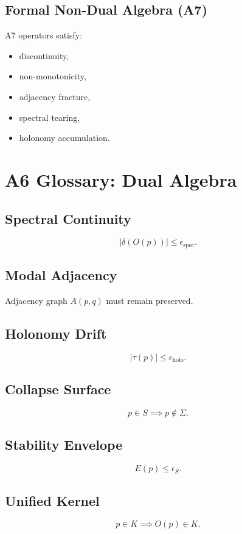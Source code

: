 \documentclass[11pt]{article}
\begin{document}
\subsection{Formal Non-Dual Algebra (A7)}
A7 operators satisfy:
\begin{itemize}
  \item discontinuity,
  \item non-monotonicity,
  \item adjacency fracture,
  \item spectral tearing,
  \item holonomy accumulation.
\end{itemize}

\section{A6 Glossary: Dual Algebra}

\subsection{Spectral Continuity}
\[
|\delta(O(p))| \le \epsilon_{\mathrm{spec}}.
\]

\subsection{Modal Adjacency}
Adjacency graph $A(p,q)$ must remain preserved.

\subsection{Holonomy Drift}
\[
|\tau(p)| \le \epsilon_{\mathrm{holo}}.
\]

\subsection{Collapse Surface}
\[
p \in S \implies p \notin \Sigma.
\]

\subsection{Stability Envelope}
\[
E(p) \le \epsilon_S.
\]

\subsection{Unified Kernel}
\[
p \in K \implies O(p) \in K.
\]
\end{document}
